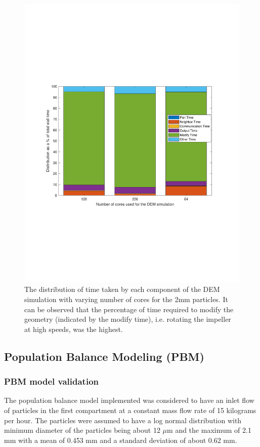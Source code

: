 \documentclass[preprint,11pt,authoryear]{elsarticle}
\begin{document}
\begin{figure}
\centering
\includegraphics[scale=0.6]{rslsts_DEM_profle_mtlb.pdf}
\caption{The distribution of time taken by each component of the DEM 
simulation with varying number of cores for the 2mm particles. It 
can be observed that the percentage of time required to modify the 
geometry (indicated by the modify time), i.e. rotating the impeller 
at high speeds, was the highest.}
\label{fig:rslts_DEM_percent_plot}
\end{figure}


\subsection{Population Balance Modeling (PBM)}
\subsubsection{PBM model validation}

The population balance model implemented was considered to have an inlet flow
of particles in the first compartment at a constant mass flow rate of 15
kilograms per hour. The particles were assumed to have a log normal
distribution with minimum diameter of the particles being about 12 $\mu$m and
the maximum of 2.1 mm with a mean of 0.453 mm and a standard deviation of
about 0.62 mm.
\end{document}
